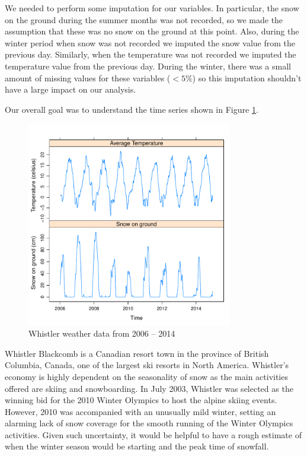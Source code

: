 \documentclass[12pt,twoside]{article}
\begin{document}
{%
We needed to perform some imputation for our variables. In particular, the snow on the ground during the summer months was not recorded, so we made the assumption that these was no snow on the ground at this point. Also, during the winter period when snow was not recorded we imputed the snow value from the previous day. Similarly, when the temperature was not recorded we imputed the temperature value from the previous day. During the winter, there was a small amount of missing values for these variables ($<5\%$) so this imputation shouldn't have a large impact on our analysis.

Our overall goal was to understand the time series shown in Figure \ref{fig:basicts}.


\begin{figure}[!ht]
\begin{center}
\includegraphics[width=0.8\textwidth]{report-basicts}
\end{center}
\caption{Whistler weather data from 2006 -- 2014}
\label{fig:basicts}
\end{figure}

Whistler Blackcomb is a Canadian resort town in the province of British Columbia, Canada, one of the largest ski resorts in North America. Whistler’s economy is highly dependent on the seasonality of snow as the main activities offered are skiing and snowboarding. In July 2003, Whistler was selected as the winning bid for the 2010 Winter Olympics to host the alpine skiing events. However, 2010 was accompanied with an unusually mild winter, setting an alarming lack of snow coverage for the smooth running of the Winter Olympics activities. Given such uncertainty, it would be helpful to have a rough estimate of when the winter season would be starting and the peak time of snowfall.

}
\end{document}
